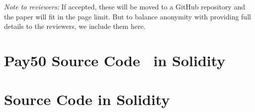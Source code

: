 
%
%

\textit{Note to reviewers:} If accepted, these will be moved to a GitHub repository and the paper will fit in the page limit. But to balance anonymity with providing full details to the reviewers, we include them here.

\section{\textsf{Pay50} Source Code~\cite{DF17} in Solidity}
\label{sec:pay50}


\clearpage

\section{\ew Source Code in Solidity}
\label{sec:eww}














